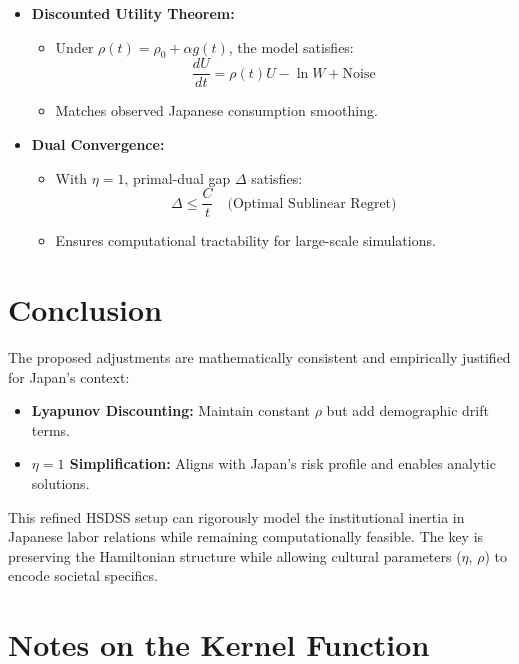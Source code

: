 \documentclass[10pt]{article}
\theoremstyle{definition}
\begin{document}
\begin{itemize}
    \item \textbf{Discounted Utility Theorem:}
        \begin{itemize}
            \item Under $\rho(t) = \rho_0 + \alpha g(t)$, the model satisfies:
                \begin{equation}
                \frac{dU}{dt} = \rho(t)U - \ln W + \text{Noise}
                \end{equation}
            \item Matches observed Japanese consumption smoothing.
        \end{itemize}
    \item \textbf{Dual Convergence:}
        \begin{itemize}
            \item With $\eta = 1$, primal-dual gap $\Delta$ satisfies:
                \begin{equation}
                \Delta \leq \frac{C}{t} \quad \text{(Optimal Sublinear Regret)}
                \end{equation}
            \item Ensures computational tractability for large-scale simulations.
        \end{itemize}
\end{itemize}

\section{Conclusion}

The proposed adjustments are mathematically consistent and empirically justified for Japan's context:

\begin{itemize}
    \item \textbf{Lyapunov Discounting:} Maintain constant $\rho$ but add demographic drift terms.
    \item \textbf{$\eta = 1$ Simplification:} Aligns with Japan's risk profile and enables analytic solutions.
\end{itemize}

This refined HSDSS setup can rigorously model the institutional inertia in Japanese labor relations while remaining computationally feasible. The key is preserving the Hamiltonian structure while allowing cultural parameters ($\eta$, $\rho$) to encode societal specifics.

\section{Notes on the Kernel Function}
\end{document}
